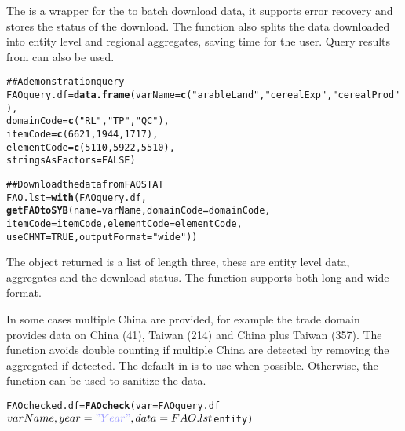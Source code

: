 \documentclass[nojss]{jss}\usepackage{graphicx, color}
\makeatletter
\newcommand{\hlfunctioncall}[1]{\textcolor[rgb]{0.501960784313725,0,0.329411764705882}{\textbf{#1}}}%
\newcommand{\hlstring}[1]{\textcolor[rgb]{0.6,0.6,1}{#1}}%
\newcommand{\hlcomment}[1]{\textcolor[rgb]{0.180392156862745,0.6,0.341176470588235}{#1}}%
\newenvironment{kframe}{%
 \def\at@end@of@kframe{}%
 \ifinner\ifhmode%
  \def\at@end@of@kframe{\end{minipage}}%
  \begin{minipage}{\columnwidth}%
 \fi\fi%
 \def\FrameCommand##1{\hskip\@totalleftmargin \hskip-\fboxsep
 \colorbox{shadecolor}{##1}\hskip-\fboxsep
     \hskip-\linewidth \hskip-\@totalleftmargin \hskip\columnwidth}%
 \MakeFramed {\advance\hsize-\width
   \@totalleftmargin\z@ \linewidth\hsize
   \@setminipage}}%
 {\par\unskip\endMakeFramed%
 \at@end@of@kframe}
\newenvironment{knitrout}{}{} %
\makeatother
\begin{document}
The  is a wrapper for the  to batch
download data, it supports error recovery and stores the status of the
download. The function also splits the data downloaded into entity
level and regional aggregates, saving time for the user. Query results
from  can also be used.

\begin{knitrout}
\color{fgcolor}\begin{kframe}
\begin{alltt}
\hlcomment{## A demonstration query}
FAOquery.df = \hlfunctioncall{data.frame}(varName = \hlfunctioncall{c}(\hlstring{"arableLand"}, \hlstring{"cerealExp"}, \hlstring{"cerealProd"}),
                         domainCode = \hlfunctioncall{c}(\hlstring{"RL"}, \hlstring{"TP"}, \hlstring{"QC"}),
                         itemCode = \hlfunctioncall{c}(6621, 1944, 1717),
                         elementCode = \hlfunctioncall{c}(5110, 5922, 5510),
                         stringsAsFactors = FALSE)

\hlcomment{## Download the data from FAOSTAT}
FAO.lst = \hlfunctioncall{with}(FAOquery.df,
    \hlfunctioncall{getFAOtoSYB}(name = varName, domainCode = domainCode,
                itemCode = itemCode, elementCode = elementCode,
                useCHMT = TRUE, outputFormat = \hlstring{"wide"}))
\end{alltt}
\end{kframe}
\end{knitrout}


The object returned is a list of length three, these are entity level
data, aggregates and the download status. The function supports both
long and wide format.

In some cases multiple China are provided, for example the trade
domain provides data on China (41), Taiwan (214) and China plus Taiwan
(357). The  function avoids double counting if multiple
China are detected by removing the aggregated if detected. The default
in  is to use  when possible. Otherwise,
the  function can be used to sanitize the data.

\begin{knitrout}
\color{fgcolor}\begin{kframe}
\begin{alltt}
FAOchecked.df = \hlfunctioncall{FAOcheck}(var = FAOquery.df$varName, year = \hlstring{"Year"},
    data = FAO.lst$entity)
\end{alltt}
\end{kframe}
\end{knitrout}
\end{document}
